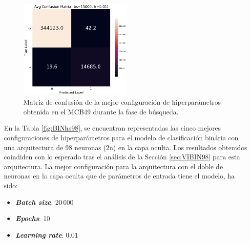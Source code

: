 \begin{figure}[H]
    \centering
    \includegraphics[width=0.5\textwidth]{./img/modelo/matrices_confusion/MC_ENT_MCB49.png}
    \caption{Matriz de confusión de la mejor configuración de hiperparámetros obtenida en el MCB49 durante la fase de búsqueda.}
    \label{fig:MC_ENT_MCB49}
\end{figure}


En la Tabla \ref{fig:BINhs98}, se encuentran representadas las cinco mejores configuraciones de hiperparámetros para el modelo de clasificación binária con una arquitectura de 98 neuronas (2n) en la capa oculta. Los resultados obtenidos coindiden con lo esperado tras el análisis de la Sección \ref{sec:VIBIN98} para esta arquitectura. La mejor configuración para la arquitectura con el doble de neuronas en la capa oculta que de parámetros de entrada tiene el modelo, ha sido:
\begin{itemize}
	\item \textbf{\textit{Batch size}}: 20\,000
	\item \textbf{\textit{Epochs}}: 10
	\item \textbf{\textit{Learning rate}}: 0.01
\end{itemize}

